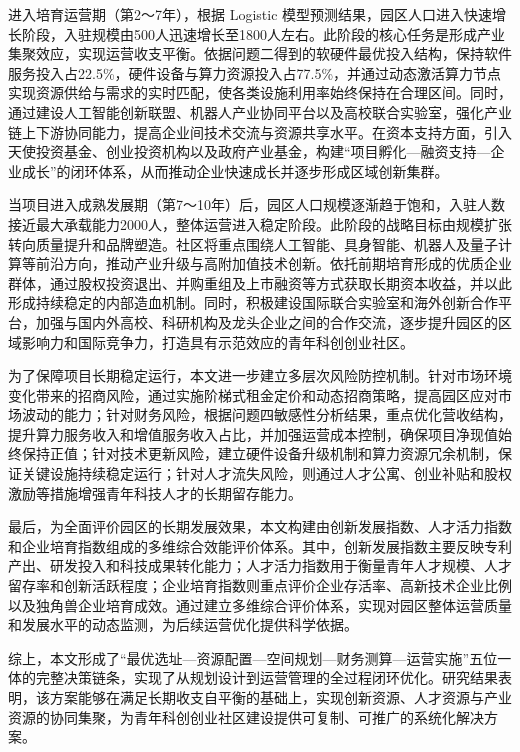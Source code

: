 \documentclass[12pt,a4paper]{article}
\begin{document}
进入培育运营期（第2～7年），根据 Logistic 模型预测结果，园区人口进入快速增长阶段，入驻规模由500人迅速增长至1800人左右。此阶段的核心任务是形成产业集聚效应，实现运营收支平衡。依据问题二得到的软硬件最优投入结构，保持软件服务投入占22.5\%，硬件设备与算力资源投入占77.5\%，并通过动态激活算力节点实现资源供给与需求的实时匹配，使各类设施利用率始终保持在合理区间。同时，通过建设人工智能创新联盟、机器人产业协同平台以及高校联合实验室，强化产业链上下游协同能力，提高企业间技术交流与资源共享水平。在资本支持方面，引入天使投资基金、创业投资机构以及政府产业基金，构建“项目孵化—融资支持—企业成长”的闭环体系，从而推动企业快速成长并逐步形成区域创新集群。

当项目进入成熟发展期（第7～10年）后，园区人口规模逐渐趋于饱和，入驻人数接近最大承载能力2000人，整体运营进入稳定阶段。此阶段的战略目标由规模扩张转向质量提升和品牌塑造。社区将重点围绕人工智能、具身智能、机器人及量子计算等前沿方向，推动产业升级与高附加值技术创新。依托前期培育形成的优质企业群体，通过股权投资退出、并购重组及上市融资等方式获取长期资本收益，并以此形成持续稳定的内部造血机制。同时，积极建设国际联合实验室和海外创新合作平台，加强与国内外高校、科研机构及龙头企业之间的合作交流，逐步提升园区的区域影响力和国际竞争力，打造具有示范效应的青年科创创业社区。

为了保障项目长期稳定运行，本文进一步建立多层次风险防控机制。针对市场环境变化带来的招商风险，通过实施阶梯式租金定价和动态招商策略，提高园区应对市场波动的能力；针对财务风险，根据问题四敏感性分析结果，重点优化营收结构，提升算力服务收入和增值服务收入占比，并加强运营成本控制，确保项目净现值始终保持正值；针对技术更新风险，建立硬件设备升级机制和算力资源冗余机制，保证关键设施持续稳定运行；针对人才流失风险，则通过人才公寓、创业补贴和股权激励等措施增强青年科技人才的长期留存能力。

最后，为全面评价园区的长期发展效果，本文构建由创新发展指数、人才活力指数和企业培育指数组成的多维综合效能评价体系。其中，创新发展指数主要反映专利产出、研发投入和科技成果转化能力；人才活力指数用于衡量青年人才规模、人才留存率和创新活跃程度；企业培育指数则重点评价企业存活率、高新技术企业比例以及独角兽企业培育成效。通过建立多维综合评价体系，实现对园区整体运营质量和发展水平的动态监测，为后续运营优化提供科学依据。

综上，本文形成了“最优选址—资源配置—空间规划—财务测算—运营实施”五位一体的完整决策链条，实现了从规划设计到运营管理的全过程闭环优化。研究结果表明，该方案能够在满足长期收支自平衡的基础上，实现创新资源、人才资源与产业资源的协同集聚，为青年科创创业社区建设提供可复制、可推广的系统化解决方案。
\end{document}
